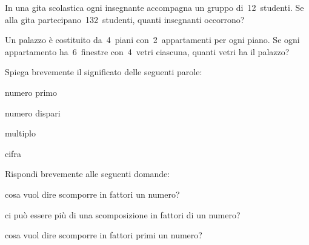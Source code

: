 \begin{multicols}{2}
\begin{esercizio}
\label{ese:1.47}
In una gita scolastica ogni insegnante accompagna un gruppo di~12~studenti. Se alla gita partecipano~132~studenti,
quanti insegnanti occorrono?
\end{esercizio}

\begin{esercizio}
\label{ese:1.48}
Un palazzo è costituito da~4~piani con~2~appartamenti per ogni piano. Se ogni appartamento ha~6~finestre con~4~vetri
ciascuna, quanti vetri ha il palazzo?
\end{esercizio}

\begin{esercizio}
\label{ese:1.49}
Spiega brevemente il significato delle seguenti parole:
 \begin{enumeratea}
 \item numero primo
 \item numero dispari
 \item multiplo
 \item cifra
 \end{enumeratea}
\end{esercizio}

\begin{esercizio}
\label{ese:1.50}
Rispondi brevemente alle seguenti domande:
 \begin{enumeratea}
 \item cosa vuol dire scomporre in fattori un numero?
 \item ci può essere più di una scomposizione in fattori di un numero?
 \item cosa vuol dire scomporre in fattori primi un numero?
 \end{enumeratea}
\end{esercizio}

\end{multicols}


